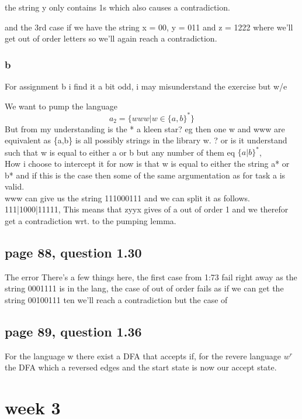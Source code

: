 \documentclass[a4paper,10pt,titlepage]{report}
\begin{document}
the string y only contains 1s which also causes a contradiction.

and the 3rd case if we have the string x = 00, y = 011 and z = 1222 where we'll get out of order letters so we'll again reach a contradiction.


\subsubsection{b}

For assignment b i find it a bit odd, i may misunderstand the exercise but w/e

We want to pump the language
\begin{equation}
a_2 = \{www|w \in \{a,b\}^*\}
\end{equation}
But from my understanding is the * a kleen star? eg then one w and www are equivalent as \{a,b\} is all possibly strings in the library w. ? or is it understand such that w is equal to either a or b but any number of them eq $\{a|b\}^*$,\\
How i choose to intercept it for now is that w is equal to either the string a* or b* and if this is the case then some of the same argumentation as for task a is valid.
\\
www can give us the string 111000111 and we can split it as follows. 111|1000|11111, This means that zyyx gives of a out of order 1 and we therefor get a contradiction wrt. to the pumping lemma.


\subsection{page 88, question 1.30}
The error There's a few things here, the first case from 1:73 fail right away as the string 0001111 is in the lang, the case of out of order fails as if we can get the string 00100111 ten we'll reach a contradiction but the case of 



\subsection{page 89, question 1.36}

For the language w there exist a DFA that accepts if, for the revere language $w^r$ the DFA which a reversed edges and the start state is now our accept state. 


\section{week 3}
\end{document}
